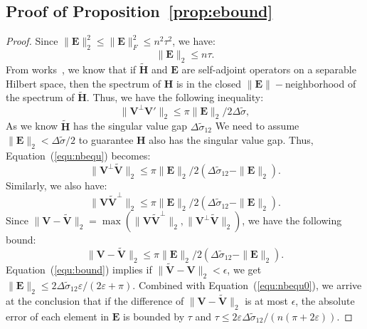 \subsection{Proof of Proposition~\ref{prop:ebound}}
\label{proof:ebound}
\begin{proof}[Proof]
Since $\|\mathbf{E}\|_2^2 \leq \|\mathbf{E}\|^2_F \leq n^2 \tau^2$, we have:
\begin{equation}
\label{equ:nbequ0}
    \|\mathbf{E}\|_2 \leq n\tau.
\end{equation}
From works~, we know that if $\widetilde{\mathbf{H}}$ and $\mathbf{E}$ are self-adjoint operators on a separable Hilbert space, then the spectrum of $\mathbf{H}$ is in the closed $\|\mathbf{E}\|-$neighborhood of the spectrum of $\widetilde{\mathbf{H}}$. Thus, we have the following inequality:
\begin{equation}
\label{equ:nbequ}
    \|\mathbf{V}^{\perp} \mathbf{V}'\|_2 \leq \pi\|\mathbf{E}\|_2/2\Delta\tilde{\sigma},
\end{equation}
As we know $\widetilde{\mathbf{H}}$ has the singular value gap $\Delta\tilde{\sigma}_{12}$
We need to assume $\|\mathbf{E}\|_2<\Delta\tilde{\sigma} / 2$ to guarantee $\mathbf{H}$ also has the singular value gap. Thus, Equation~(\ref{equ:nbequ}) becomes:
\begin{equation}
\label{equ:nbequ2}
    \|\mathbf{V}^{\perp} \widetilde{\mathbf{V}}\|_2 \leq \pi\|\mathbf{E}\|_2/2(\Delta\tilde{\sigma}_{12}-\|\mathbf{E}\|_2).
\end{equation}
Similarly, we also have:
\begin{equation}
\label{equ:nbequ3}
    \|\mathbf{V}\widetilde{\mathbf{V}}^{\perp}\|_2 \leq \pi\|\mathbf{E}\|_2/2(\Delta\tilde{\sigma}_{12}-\|\mathbf{E}\|_2).
\end{equation}
Since $\|\mathbf{V}-\widetilde{\mathbf{V}}\|_2 = \max(\|\mathbf{V}\widetilde{\mathbf{V}}^{\perp}\|_2,\|\mathbf{V}^{\perp}\widetilde{\mathbf{V}}\|_2)$, we have the following bound:
\begin{equation}
\label{equ:bound}
    \|\mathbf{V}-\widetilde{\mathbf{V}}\|_2  \leq \pi\|\mathbf{E}\|_2/2(\Delta\tilde{\sigma}_{12}-\|\mathbf{E}\|_2).
\end{equation}
Equation~(\ref{equ:bound}) implies if $\|\widetilde{\mathbf{V}} - \mathbf{V}\|_2<\epsilon$, we get $\|\mathbf{E}\|_2 \leq 2 \Delta\tilde{\sigma}_{12} \varepsilon/(2 \varepsilon+\pi)$. Combined with Equation~(\ref{equ:nbequ0}), we arrive at the conclusion that if the difference of $\|\mathbf{V}-\widetilde{\mathbf{V}}\|_2$ is at most $\epsilon$, the absolute error of each element in $\mathbf{E}$ is bounded by $\tau$ and $\tau \leq 2 \varepsilon \Delta\tilde{\sigma}_{12} /(n(\pi+2 \varepsilon))$.
\end{proof}


